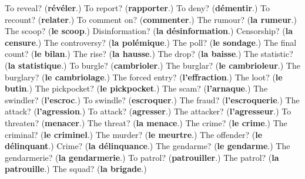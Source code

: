 \begin{tcolorbox}[breakable,colback=teal!4,colframe=teal!35!black,title={Before you move on}]
To reveal? (\textbf{révéler}.) To report? (\textbf{rapporter}.) To deny? (\textbf{démentir}.) To recount? (\textbf{relater}.) To comment on? (\textbf{commenter}.) The rumour? (\textbf{la rumeur}.) The scoop? (\textbf{le scoop}.) Disinformation? (\textbf{la désinformation}.) Censorship? (\textbf{la censure}.) The controversy? (\textbf{la polémique}.) The poll? (\textbf{le sondage}.) The final count? (\textbf{le bilan}.) The rise? (\textbf{la hausse}.) The drop? (\textbf{la baisse}.) The statistic? (\textbf{la statistique}.) To burgle? (\textbf{cambrioler}.) The burglar? (\textbf{le cambrioleur}.) The burglary? (\textbf{le cambriolage}.) The forced entry? (\textbf{l'effraction}.) The loot? (\textbf{le butin}.) The pickpocket? (\textbf{le pickpocket}.) The scam? (\textbf{l'arnaque}.) The swindler? (\textbf{l'escroc}.) To swindle? (\textbf{escroquer}.) The fraud? (\textbf{l'escroquerie}.) The attack? (\textbf{l'agression}.) To attack? (\textbf{agresser}.) The attacker? (\textbf{l'agresseur}.) To threaten? (\textbf{menacer}.) The threat? (\textbf{la menace}.) The crime? (\textbf{le crime}.) The criminal? (\textbf{le criminel}.) The murder? (\textbf{le meurtre}.) The offender? (\textbf{le délinquant}.) Crime? (\textbf{la délinquance}.) The gendarme? (\textbf{le gendarme}.) The gendarmerie? (\textbf{la gendarmerie}.) To patrol? (\textbf{patrouiller}.) The patrol? (\textbf{la patrouille}.) The squad? (\textbf{la brigade}.)
\end{tcolorbox}
